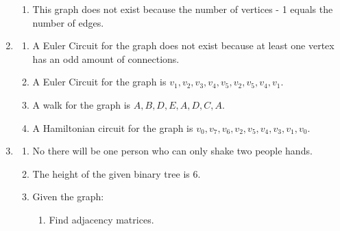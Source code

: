 \documentclass{article}
\begin{document}
\begin{enumerate}
\begin{enumerate}
        \item This graph does not exist because the number of vertices - 1 equals the 
        number of edges.
        

    \end{enumerate}

    \vspace{2cm}
    \item 
    
    \begin{enumerate}
        \item  A Euler Circuit for the graph does not exist because at least one vertex has an 
        odd amount of connections.

        \item A Euler Circuit for the graph is 
        $v_{1}, v_{2}, v_{3}, v_{4}, v_{5}, v_{2}, v_{5}, v_{4}, v_{1}$.

        \item A walk for the graph is $A, B, D, E, A, D, C, A$.

        \item A Hamiltonian circuit for the graph is 
        $v_{0}, v_{7}, v_{6}, v_{2}, v_{5}, v_{4}, v_{3}, v_{1}, v_{0}$.
        
    \end{enumerate}
    
    \newpage
    \item 

    \begin{enumerate}
        \item  No there will be one person who can only shake two people hands.

        \item The height of the given binary tree is 6.

        \item Given the graph:

        \begin{enumerate}
            \item Find adjacency matrices.
            

\end{enumerate}
\end{enumerate}
\end{enumerate}
\end{document}
